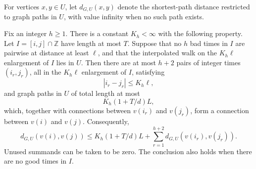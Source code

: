 For vertices $x,y\in U$, let $d_{G,U}(x,y)$ denote the shortest-path
distance restricted to graph paths in $U$, with value infinity when no
such path exists.

\begin{lemma}\label{spike:covering}
Fix an integer $h\ge1$.  There is a constant $K_h<\infty$ with the
following property.  Let $I=[i,j]\cap\mathbb Z$ have length at most $T$.
Suppose that no $h$ bad times in $I$ are pairwise at distance at least
$\ell$, and that the interpolated walk on the $K_h\ell$ enlargement
of $I$ lies in $U$.  Then there are at most $h+2$ pairs of integer times
$(i_r,j_r)$, all in the $K_h\ell$ enlargement of $I$, satisfying
\[
 |i_r-j_r|\le K_h\ell,
\]
and graph paths in $U$ of total length at most
\[
 K_h(1+T/d)L,
\]
which, together with connections between $v(i_r)$ and $v(j_r)$, form a
connection between $v(i)$ and $v(j)$.  Consequently,
\begin{equation}\label{spike:covering-recursion}
 d_{G,U}(v(i),v(j))\le K_h(1+T/d)L
       +\sum_{r=1}^{h+2}d_{G,U}(v(i_r),v(j_r)).
\end{equation}
Unused summands can be taken to be zero.  The conclusion also holds when
there are no good times in $I$.
\end{lemma}

